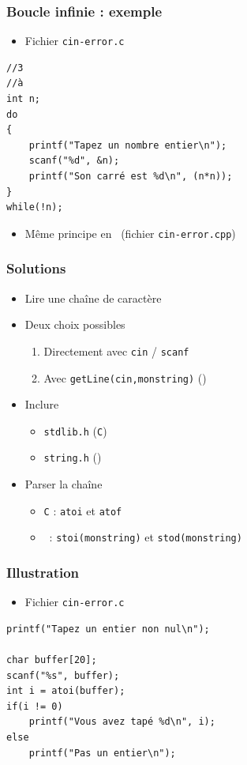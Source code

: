 \begin{frame}[containsverbatim]
\frametitle{Boucle infinie : exemple}
\begin{itemize}
\item Fichier \texttt{cin-error.c}
\end{itemize}
\begin{lstlisting}
//3
//à
int n;
do
{
	printf("Tapez un nombre entier\n");
	scanf("%d", &n);
	printf("Son carré est %d\n", (n*n));
}
while(!n);
\end{lstlisting}
\begin{itemize}
\item Même principe en \cpp~(fichier \texttt{cin-error.cpp})
\end{itemize}
\end{frame}

\begin{frame}
\frametitle{Solutions}
\begin{itemize}[<+->]
\item Lire une chaîne de caractère
\item Deux choix possibles
	\begin{enumerate}
	\item Directement avec \texttt{cin} / \texttt{scanf}
	\item Avec \texttt{getLine(cin,monstring)} (\cpp)
	\end{enumerate}
\item Inclure 
	\begin{itemize}
	\item \texttt{stdlib.h} (\texttt{C})
	\item \texttt{string.h} (\cpp)
	\end{itemize}	
\item Parser la chaîne
	\begin{itemize}
	\item \texttt{C} : \texttt{atoi} et \texttt{atof}
	\item \cpp\ : \texttt{stoi(monstring)} et \texttt{stod(monstring)}	
	\end{itemize}
\end{itemize}
\end{frame}

\begin{frame}[containsverbatim]
\frametitle{Illustration}
\begin{itemize}
\item Fichier \texttt{cin-error.c}
\end{itemize}
\begin{lstlisting}
printf("Tapez un entier non nul\n");
        
char buffer[20];
scanf("%s", buffer);
int i = atoi(buffer);
if(i != 0)
    printf("Vous avez tapé %d\n", i);
else
    printf("Pas un entier\n");
\end{lstlisting}
\end{frame}

